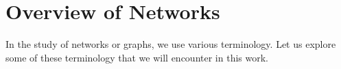 \documentclass[10pt,a4paper]{article}
\begin{document}
%


\section*{Overview of Networks}
In the study of networks or graphs, we use various terminology. Let us explore some of these terminology that we will encounter in this work.
\end{document}
